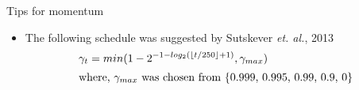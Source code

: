 \begin{frame}
	\begin{overlayarea}{\textwidth}{\textheight}
		\begin{block}{Tips for momentum}
			\begin{itemize}\justifying
				\item The following schedule was suggested by Sutskever \textit{et. al.}, 2013
				      \begin{align*}
				      	\gamma_t = min (1 - 2^{-1 - log_2(\lfloor {t/250} \rfloor + 1)}, \gamma_{max})      \\
				      	\intertext{where, $\gamma_{max}$ was chosen from \{0.999, 0.995, 0.99, 0.9, 0\}} 
				      \end{align*}
			\end{itemize}
		\end{block}
	\end{overlayarea}
\end{frame}

